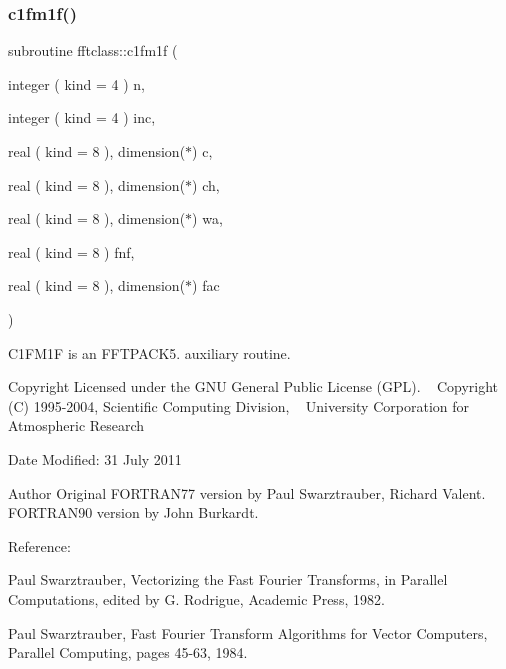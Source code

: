 \subsubsection{\texorpdfstring{c1fm1f()}{c1fm1f()}}
{\footnotesize\ttfamily subroutine fftclass\+::c1fm1f (\begin{DoxyParamCaption}\item[{integer ( kind = 4 )}]{n,  }\item[{integer ( kind = 4 )}]{inc,  }\item[{real ( kind = 8 ), dimension($\ast$)}]{c,  }\item[{real ( kind = 8 ), dimension($\ast$)}]{ch,  }\item[{real ( kind = 8 ), dimension($\ast$)}]{wa,  }\item[{real ( kind = 8 )}]{fnf,  }\item[{real ( kind = 8 ), dimension($\ast$)}]{fac }\end{DoxyParamCaption})}



C1\+F\+M1F is an F\+F\+T\+P\+A\+C\+K5. auxiliary routine. 

\begin{DoxyCopyright}{Copyright}
Licensed under the G\+NU General Public License (G\+PL). ~\newline
 Copyright (C) 1995-\/2004, Scientific Computing Division, ~\newline
 University Corporation for Atmospheric Research 
\end{DoxyCopyright}
\begin{DoxyDate}{Date}
Modified\+: 31 July 2011 
\end{DoxyDate}
\begin{DoxyAuthor}{Author}
Original F\+O\+R\+T\+R\+A\+N77 version by Paul Swarztrauber, Richard Valent. ~\newline
 F\+O\+R\+T\+R\+A\+N90 version by John Burkardt.
\end{DoxyAuthor}
\begin{DoxyVerb}  Reference:

    Paul Swarztrauber,
    Vectorizing the Fast Fourier Transforms,
    in Parallel Computations,
    edited by G. Rodrigue,
    Academic Press, 1982.

    Paul Swarztrauber,
    Fast Fourier Transform Algorithms for Vector Computers,
    Parallel Computing, pages 45-63, 1984.\end{DoxyVerb}
 
